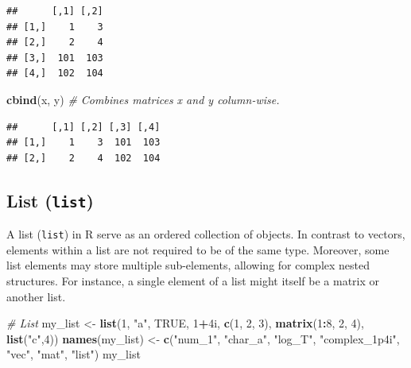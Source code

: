 \documentclass[
]{book}
\newenvironment{Shaded}{\begin{snugshade}}{\end{snugshade}}
\newcommand{\CommentTok}[1]{\textcolor[rgb]{0.56,0.35,0.01}{\textit{#1}}}
\newcommand{\ConstantTok}[1]{\textcolor[rgb]{0.56,0.35,0.01}{#1}}
\newcommand{\DecValTok}[1]{\textcolor[rgb]{0.00,0.00,0.81}{#1}}
\newcommand{\FunctionTok}[1]{\textcolor[rgb]{0.13,0.29,0.53}{\textbf{#1}}}
\newcommand{\NormalTok}[1]{#1}
\newcommand{\OtherTok}[1]{\textcolor[rgb]{0.56,0.35,0.01}{#1}}
\newcommand{\SpecialCharTok}[1]{\textcolor[rgb]{0.81,0.36,0.00}{\textbf{#1}}}
\newcommand{\StringTok}[1]{\textcolor[rgb]{0.31,0.60,0.02}{#1}}
\begin{document}
\begin{verbatim}
##      [,1] [,2]
## [1,]    1    3
## [2,]    2    4
## [3,]  101  103
## [4,]  102  104
\end{verbatim}

\begin{Shaded}
\begin{Highlighting}[]
\FunctionTok{cbind}\NormalTok{(x, y)  }\CommentTok{\# Combines matrices x and y column{-}wise.}
\end{Highlighting}
\end{Shaded}

\begin{verbatim}
##      [,1] [,2] [,3] [,4]
## [1,]    1    3  101  103
## [2,]    2    4  102  104
\end{verbatim}

\hypertarget{list-list}{%
\subsection{\texorpdfstring{List (\texttt{list})}{List (list)}}\label{list-list}}

A list (\texttt{list}) in R serve as an ordered collection of objects. In contrast to vectors, elements within a list are not required to be of the same type. Moreover, some list elements may store multiple sub-elements, allowing for complex nested structures. For instance, a single element of a list might itself be a matrix or another list.

\begin{Shaded}
\begin{Highlighting}[]
\CommentTok{\# List}
\NormalTok{my\_list }\OtherTok{\textless{}{-}} \FunctionTok{list}\NormalTok{(}\DecValTok{1}\NormalTok{, }\StringTok{"a"}\NormalTok{, }\ConstantTok{TRUE}\NormalTok{, }\DecValTok{1}\SpecialCharTok{+}\NormalTok{4i, }
                \FunctionTok{c}\NormalTok{(}\DecValTok{1}\NormalTok{, }\DecValTok{2}\NormalTok{, }\DecValTok{3}\NormalTok{), }\FunctionTok{matrix}\NormalTok{(}\DecValTok{1}\SpecialCharTok{:}\DecValTok{8}\NormalTok{, }\DecValTok{2}\NormalTok{, }\DecValTok{4}\NormalTok{), }\FunctionTok{list}\NormalTok{(}\StringTok{"c"}\NormalTok{,}\DecValTok{4}\NormalTok{))}
\FunctionTok{names}\NormalTok{(my\_list) }\OtherTok{\textless{}{-}} \FunctionTok{c}\NormalTok{(}\StringTok{"num\_1"}\NormalTok{, }\StringTok{"char\_a"}\NormalTok{, }\StringTok{"log\_T"}\NormalTok{, }\StringTok{"complex\_1p4i"}\NormalTok{,}
                    \StringTok{"vec"}\NormalTok{, }\StringTok{"mat"}\NormalTok{, }\StringTok{"list"}\NormalTok{)}
\NormalTok{my\_list}
\end{Highlighting}
\end{Shaded}
\end{document}
